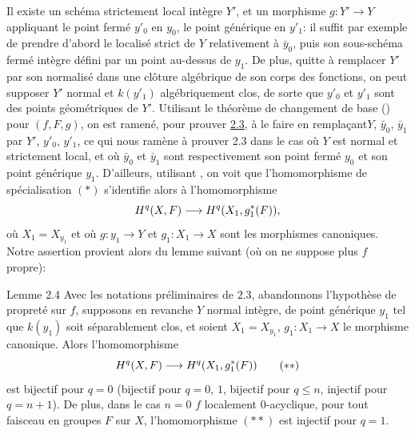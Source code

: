 \documentclass[10pt]{../fichiers-configuration-latex/smfart}
\begin{document}
Il existe un schéma strictement local intègre $Y'$, et un morphisme
$g:Y'\rightarrow Y$ appliquant le point fermé $y'_0$ en $y_{0}$, le point
générique en $y'_1$: il suffit par exemple de prendre d'abord le
localisé strict de $Y$ relativement à $\bar{y}_0$, puis son
sous-schéma fermé intègre défini par un point au-dessus de $y_1$. De
plus, quitte à remplacer $Y'$ par son normalisé dans une clôture
algébrique de son corps des fonctions, on peut supposer $Y'$ normal et
$k(y'_1)$ algébriquement clos, de sorte que $y'_0$ et $y'_1$ sont des
points géométriques de $Y'$. Utilisant le théorème de changement de
base () pour $(f,F,g)$, on est ramené, pour prouver \hyperref[XVI.cor2.3]{2.3}, à le
faire en remplaçant\pageoriginale $Y$, $\bar{y}_0$, $\bar{y}_1$ par
$Y'$, $y'_0$, $y'_1$, ce qui nous ramène à prouver 2.3 dans le cas où
$Y$ est normal et strictement local, et où $\bar{y}_0$ et $\bar{y}_1$
sont respectivement son point fermé $y_0$ et son point générique
$y_1$. D'ailleurs, utilisant , on voit que l'homomorphisme de
spécialisation $(\ast)$ s'identifie alors à l'homomorphisme
$$
H^{q}(X,F)\longrightarrow H^{q}(X_1,g^{\ast}_1(F)){},
$$
où $X_1=X_{y_1}$ et où $g:y_1\rightarrow Y$ et $g_1:X_1\rightarrow X$
sont les morphismes canoniques. Notre assertion provient alors du
lemme suivant (où on ne suppose plus $f$ propre):

\begin{enonce*}{Lemme 2.4}
Avec les notations préliminaires de $2.3$, abandonnons l'hypothèse de
propreté sur $f$, supposons en revanche $Y$ normal intègre, de point
générique $y_1$ tel que $k(y_1)$ soit séparablement clos, et soient
$X_1=X_{y_1}$, $g_1:X_1\rightarrow X$ le morphisme canonique. Alors
l'homomorphisme
\begin{equation*}
H^{q}(X,F)\longrightarrow H^{q}(X_1,g^{\ast}_1(F))\tag{${\ast}{\ast}$}
\end{equation*}
est bijectif pour $q=0$ (\resp bijectif pour $q=0$, $1$, \resp
bijectif pour $q\leq n$, injectif pour $q=n+1$). De plus, dans le cas
$n=0$ \ie $f$ localement $0$-acyclique, pour tout faisceau en groupes $F$
sur $X$, l'homomorphisme $({\ast}{\ast})$ est injectif pour $q=1$.
\end{enonce*}
\end{document}
